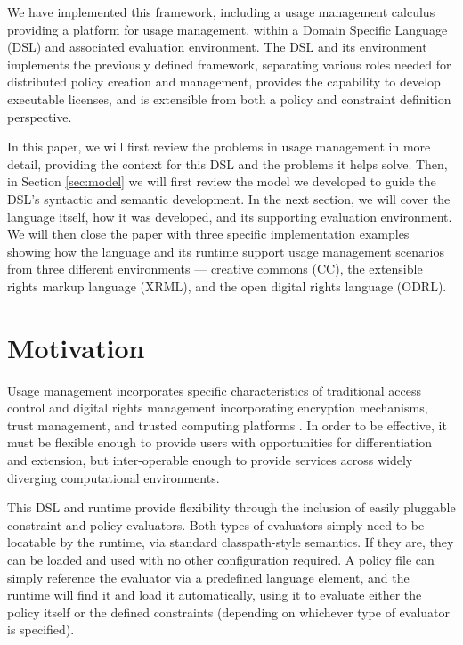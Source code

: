 We have implemented this framework, including a usage management calculus providing a platform for usage management, within a Domain Specific Language (DSL) and associated evaluation environment. The DSL and its environment implements the previously defined framework, separating various roles needed for distributed policy creation and management, provides the capability to develop executable licenses, and is extensible from both a policy and constraint definition perspective.

In this paper, we will first review the problems in usage management in more detail, providing the context for this DSL and the problems it helps solve.  Then, in Section \ref{sec:model} we will first review the model we developed to guide the DSL's syntactic and semantic development. In the next section, we will cover the language itself, how it was developed, and its supporting evaluation environment.  We will then close the paper with three specific implementation examples showing how the language and its runtime support usage management scenarios from three different environments --- creative commons (CC), the extensible rights markup language (XRML), and the open digital rights language (ODRL).

\section{Motivation}\label{sec:motivation}
Usage management incorporates specific characteristics of traditional access control and digital rights management incorporating encryption mechanisms, trust management, and trusted computing platforms \cite{Jamkhedkar:2010:IUM:1866870.1866885}.  In order to be effective, it must be flexible enough to provide users with opportunities for differentiation and extension, but inter-operable enough to provide services across widely diverging computational environments.

This DSL and runtime provide flexibility through the inclusion of easily pluggable constraint and policy evaluators.  Both types of evaluators simply need to be locatable by the runtime, via standard classpath-style semantics.  If they are, they can be loaded and used with no other configuration required.  A policy file can simply reference the evaluator via a predefined language element, and the runtime will find it and load it automatically, using it to evaluate either the policy itself or the defined constraints (depending on whichever type of evaluator is specified).

